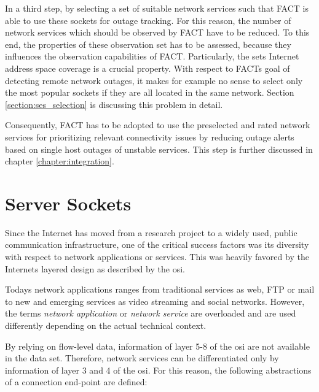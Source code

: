 In a third step, by selecting a set of suitable network services such that 
\gls{FACT} is able to use these sockets for outage tracking. For this reason, 
the number of network services which should be observed by \gls{FACT} have to be 
reduced. To this end, the properties of these observation set has to be 
assessed, because they influences the observation capabilities of \gls{FACT}. 
Particularly, the sets Internet address space coverage is a crucial 
property. With respect to FACTs goal of detecting remote network 
outages, it makes for example no sense to select only the most popular sockets 
if they are all located in the same network. Section \ref{section:ses_selection} 
is discussing this problem in detail. 

Consequently, \gls{FACT} has to be adopted to use the preselected and rated 
network services for prioritizing relevant connectivity issues by reducing 
outage alerts based on single host outages of unstable services. This step is 
further discussed in chapter \ref{chapter:integration}.

\section{Server Sockets}
Since the Internet has moved from a research project to a widely used, public
communication infrastructure, one of the critical success factors was its
diversity with respect to network applications or services. This was heavily
favored by the Internets layered design as described by the \gls{osi}.

Todays network applications ranges from traditional services as web, \gls{FTP}
or mail to new and emerging services as video streaming and social networks.
However, the terms \emph{network application} or \emph{network service} are
overloaded and are used differently depending on the actual technical context.

By relying on flow-level data, information of layer 5-8 of the \gls{osi} are not
available in the data set. Therefore, network services can be differentiated
only by information of layer 3 and 4 of the \gls{osi}. For this reason, the
following abstractions of a connection end-point are defined:

